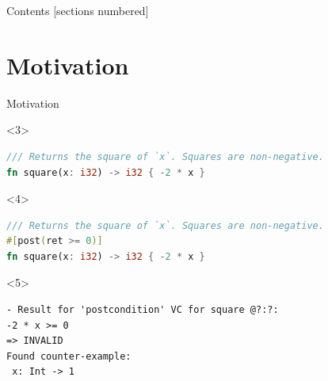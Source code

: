 \begin{frame}{Contents}
  [sections numbered]

  \tableofcontents%
\end{frame}

\section{Motivation}

\begin{frame}[fragile]{Motivation}
\centering
{}


\begin{onlyenv}<3>
\begin{lstlisting}[style=short, language=Rust]
/// Returns the square of `x`. Squares are non-negative.
fn square(x: i32) -> i32 { -2 * x }
\end{lstlisting}
\end{onlyenv}
\begin{onlyenv}<4>
\begin{lstlisting}[style=short, language=Rust]
/// Returns the square of `x`. Squares are non-negative.
#[post(ret >= 0)]
fn square(x: i32) -> i32 { -2 * x }
\end{lstlisting}
\end{onlyenv}
\begin{onlyenv}<5>
\begin{lstlisting}[style=short]
- Result for 'postcondition' VC for square @?:?:
-2 * x >= 0
=> INVALID
Found counter-example:
 x: Int -> 1
\end{lstlisting}
\end{onlyenv}
\end{frame}



